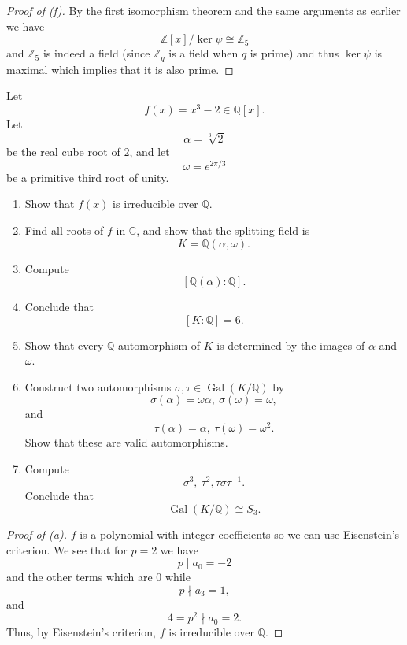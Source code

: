 \begin{proof}[Proof of (f)]
    By the first isomorphism theorem and the same 
    arguments as earlier we have 
    \[
        \mathbb Z[x]/\ker \psi \cong \mathbb Z_5
    \]
    and $\mathbb Z_5$ is indeed a field 
    (since $\mathbb Z_q$ is a field when $q$ 
    is prime) and thus $\ker \psi$ is maximal 
    which implies that it is also prime.
\end{proof}

\begin{prob}
    Let 
    \[
        f(x) = x^3 - 2 \in \mathbb Q[x]. 
    \]
    Let 
    \[
        \alpha = \sqrt[3]2
    \]
    be the real cube root of $2$, 
    and let 
    \[
        \omega = e^{2\pi/3}
    \]
    be a primitive third root of unity. 
    \begin{enumerate}[label=\alph*)]
        \item Show that $f(x)$ is irreducible over 
            $\mathbb Q$.
        \item Find all roots of $f$ in 
            $\mathbb C$, and show that the splitting 
            field is 
            \[
                K = \mathbb Q(\alpha, \omega). 
            \]
        \item Compute 
            \[
                [\mathbb Q(\alpha) : \mathbb Q].
            \]
        \item Conclude that 
            \[
                [K : \mathbb Q] = 6.
            \]
        \item Show that every $\mathbb Q$-automorphism 
            of $K$ is determined by the images 
            of $\alpha$ and $\omega$.
        \item Construct two automorphisms $\sigma,\tau 
            \in \operatorname{Gal}(K/\mathbb Q)$ by 
            \[
                \sigma(\alpha) = \omega\alpha, \ \sigma(\omega) = \omega, 
            \]
            and 
            \[
                \tau(\alpha) = \alpha, \ \tau(\omega) = \omega^2.
            \]
            Show that these are valid automorphisms. 
        \item Compute 
            \[
                \sigma^3, \ \tau^2, \tau\sigma\tau^{-1}.
            \]
            Conclude that 
            \[
                \operatorname{Gal}(K/\mathbb Q)\cong S_3.
            \]
    \end{enumerate}
\end{prob}
\begin{proof}[Proof of (a)]
    $f$ is a polynomial with integer coefficients so 
    we can use Eisenstein's criterion. 
    We see that for $p = 2$ we have 
    \[
        p \mid a_0 = -2 
    \]
    and the other terms 
    which are $0$
    while 
    \[
        p \nmid a_3 = 1, 
    \]
    and 
    \[
        4 = p^2 \nmid a_0 = 2.
    \]
    Thus, by Eisenstein's criterion, $f$ is irreducible 
    over $\mathbb Q$.
\end{proof}
